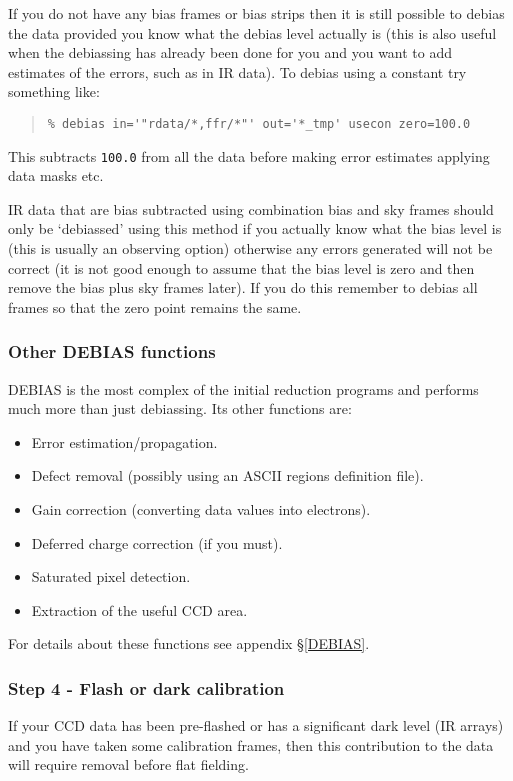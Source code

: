\documentclass[twoside,11pt]{article}
\newcommand{\hyperref}[4]{#2\ref{#4}#3}
\newcommand{\htmlref}[2]{#1}
\newcommand{\latexhtml}[2]{#1}
\newcommand{\xlabel}[1]{}
\renewcommand{\_}{\texttt{\symbol{95}}}
\newcommand{\ttsize}{\latexhtml{\small}{}}
\newenvironment{myquote}{\begin{quote}\ttsize}{\end{quote}}
\newcommand{\text}[1]{{\ttsize \tt #1}}
\newcommand{\xroutine}[1]{\htmlref{{\sc #1}}{#1}}
\begin{document}
If you do not have any bias frames or bias strips then it is still
possible to debias the data provided you know what the debias level
actually is (this is also useful when the debiassing has already been
done for you and you want to add estimates of the errors, such as in
IR data).
To debias using a constant try something like:
\begin{myquote}
\begin{verbatim}
% debias in='"rdata/*,ffr/*"' out='*_tmp' usecon zero=100.0
\end{verbatim}
\end{myquote}
This subtracts \text{100.0} from all the data before making error
estimates applying data masks etc.

IR data that are bias subtracted using combination bias and sky frames
should only be `debiassed' using this method if you actually know what
the bias level is (this is usually an observing option) otherwise any
errors generated will not be correct (it is not good enough to assume
that the bias level is zero and then remove the bias plus sky frames
later).
If you do this remember to debias all frames so that the zero point
remains the same.

\subsubsection{\label{otherdebias}Other DEBIAS functions}
\xroutine{DEBIAS} is the most complex of the initial reduction programs and
performs much more than just debiassing. Its other functions are:
\begin{itemize}
\item Error estimation/propagation.
\item Defect removal (possibly using an \htmlref{ASCII regions definition
file}{datamasks}).
\item Gain correction (converting data values into electrons).
\item Deferred charge correction (if you must).
\item Saturated pixel detection.
\item Extraction of the useful CCD area.
\end{itemize}

For details about these functions see
\hyperref{the full description}{appendix \S}{}{DEBIAS}.

\subsubsection{\xlabel{flashordark}Step 4 - Flash or dark calibration
               \label{flashordark}}
If your CCD data has been pre-flashed or has a significant dark level
(IR arrays) and you have taken some calibration frames, then this
contribution to the data will require removal before flat fielding.
\end{document}
